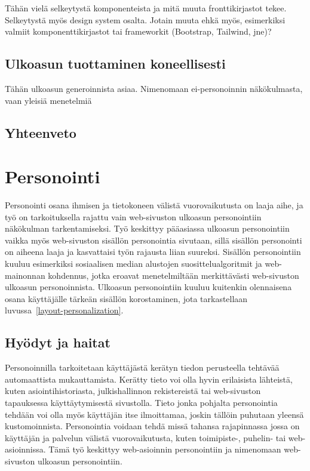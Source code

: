 \documentclass[finnish, 12pt, a4paper, elec, utf8, a-1b, online]{aaltothesis}
\begin{document}
Tähän vielä selkeytystä komponenteista ja mitä muuta fronttikirjastot tekee.
Selkeytystä myös design system osalta. Jotain muuta ehkä myös, esimerkiksi valmiit
komponenttikirjastot tai frameworkit (Bootstrap, Tailwind, jne)?

\subsection{Ulkoasun tuottaminen koneellisesti}

Tähän ulkoasun generoinnista asiaa. Nimenomaan ei-personoinnin näkökulmasta,
vaan yleisiä menetelmiä

\subsection{Yhteenveto}

\clearpage

\section{Personointi}

Personointi osana ihmisen ja tietokoneen välistä vuorovaikutusta on laaja aihe,
ja työ on tarkoituksella rajattu vain web-sivuston ulkoasun personointiin
näkökulman tarkentamiseksi. Työ keskittyy pääasiassa ulkoasun personointiin
vaikka myös web-sivuston sisällön personointia sivutaan, sillä sisällön
personointi on aiheena laaja ja kasvattaisi työn rajausta liian suureksi.
Sisällön personointiin kuuluu esimerkiksi sosiaalisen median alustojen
suosittelualgoritmit ja web-mainonnan kohdennus, jotka eroavat menetelmiltään
merkittävästi web-sivuston ulkoasun personoinnista. Ulkoasun personointiin
kuuluu kuitenkin olennaisena osana käyttäjälle tärkeän sisällön korostaminen,
jota tarkastellaan luvussa~\ref{layout-personalization}.

\subsection{Hyödyt ja haitat}

Personoinnilla tarkoitetaan käyttäjästä kerätyn tiedon perusteella tehtävää
automaattista mukauttamista. Kerätty tieto voi olla hyvin erilaisista lähteistä,
kuten asiointihistoriasta, julkishallinnon rekistereistä tai web-sivuston
tapauksessa käyttäytymisestä sivustolla. Tieto jonka pohjalta personointia
tehdään voi olla myös käyttäjän itse ilmoittamaa, joskin tällöin puhutaan
yleensä kustomoinnista. Personointia voidaan tehdä missä tahansa rajapinnassa
jossa on käyttäjän ja palvelun välistä vuorovaikutusta, kuten toimipiste-,
puhelin- tai web-asioinnissa. Tämä työ keskittyy web-asioinnin personointiin
ja nimenomaan web-sivuston ulkoasun personointiin.
\end{document}
